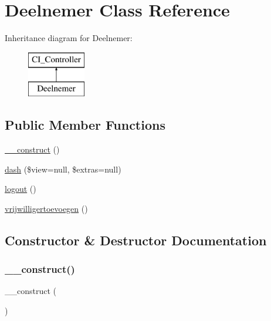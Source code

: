 \hypertarget{class_deelnemer}{}\section{Deelnemer Class Reference}
\label{class_deelnemer}
Inheritance diagram for Deelnemer\+:\begin{figure}[H]
\begin{center}
\leavevmode
\includegraphics[height=2.000000cm]{class_deelnemer}
\end{center}
\end{figure}
\subsection*{Public Member Functions}
\begin{DoxyCompactItemize}
\item 
\mbox{\hyperlink{class_deelnemer_a095c5d389db211932136b53f25f39685}{\+\_\+\+\_\+construct}} ()
\item 
\mbox{\hyperlink{class_deelnemer_a35f5125b52883ea70807c42282f60b54}{dash}} (\$view=null, \$extras=null)
\item 
\mbox{\hyperlink{class_deelnemer_a082405d89acd6835c3a7c7a08a7adbab}{logout}} ()
\item 
\mbox{\hyperlink{class_deelnemer_a4ad528eb297f8dc0084b986f58fe2d2c}{vrijwilligertoevoegen}} ()
\end{DoxyCompactItemize}


\subsection{Constructor \& Destructor Documentation}
\mbox{\label{class_deelnemer_a095c5d389db211932136b53f25f39685}} 
\subsubsection{\texorpdfstring{\+\_\+\+\_\+construct()}{\_\_construct()}}
{\footnotesize\ttfamily \+\_\+\+\_\+construct (\begin{DoxyParamCaption}{ }\end{DoxyParamCaption})}

